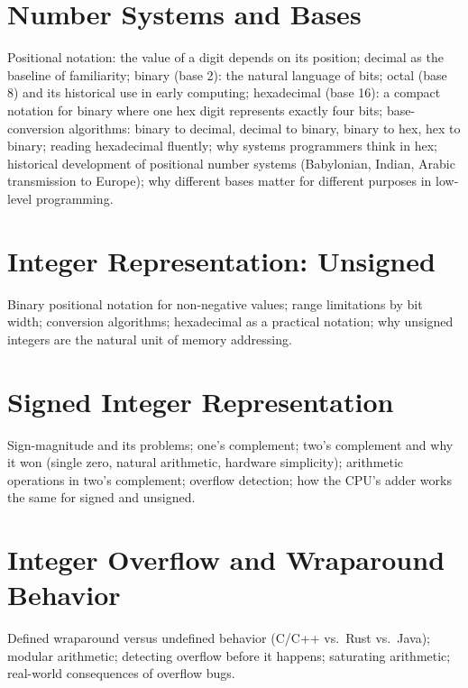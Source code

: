 \chapter{Number Systems and Bases}
\label{ch:number-systems}

Positional notation: the value of a digit depends on its position;
decimal as the baseline of familiarity; binary (base 2): the natural
language of bits; octal (base 8) and its historical use in early computing;
hexadecimal (base 16): a compact notation for binary where one hex digit
represents exactly four bits; base-conversion algorithms: binary to
decimal, decimal to binary, binary to hex, hex to binary; reading
hexadecimal fluently; why systems programmers think in hex; historical
development of positional number systems (Babylonian, Indian, Arabic
transmission to Europe); why different bases matter for different
purposes in low-level programming.



\chapter{Integer Representation: Unsigned}
\label{ch:unsigned-integers}

Binary positional notation for non-negative values; range limitations by
bit width; conversion algorithms; hexadecimal as a practical notation;
why unsigned integers are the natural unit of memory addressing.

\chapter{Signed Integer Representation}
\label{ch:signed-integers}

Sign-magnitude and its problems; one's complement; two's complement and why
it won (single zero, natural arithmetic, hardware simplicity); arithmetic
operations in two's complement; overflow detection; how the CPU's adder works
the same for signed and unsigned.

\chapter{Integer Overflow and Wraparound Behavior}
\label{ch:integer-overflow}

Defined wraparound versus undefined behavior (C/C++ vs.\ Rust vs.\ Java);
modular arithmetic; detecting overflow before it happens; saturating
arithmetic; real-world consequences of overflow bugs.


